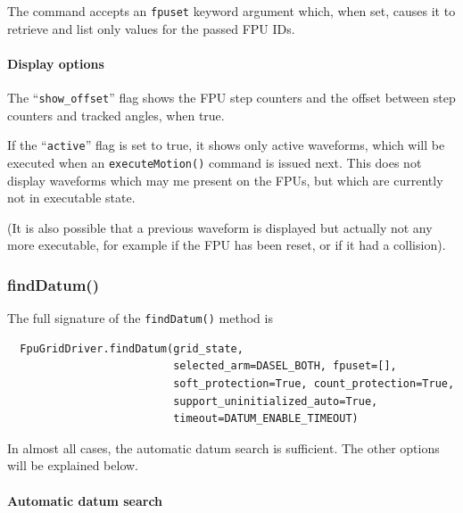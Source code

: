 \documentclass[11pt,a4paper]{scrartcl}
\begin{document}
The command accepts an \texttt{fpuset} keyword argument which, when
set, causes it to retrieve and list only values for the passed FPU
IDs.

\paragraph{Display options}

The ``\texttt{show\_offset}'' flag shows the FPU step counters and
the offset between step counters and tracked angles, when
true.

If the ``\texttt{active}'' flag is set to true, it shows only active
waveforms, which will be executed when an \texttt{executeMotion()}
command is issued next. This does not display waveforms which may me
present on the FPUs, but which are currently not in executable state.

(It is also possible that a previous waveform is displayed but
actually not any more executable, for example if the FPU has been
reset, or if it had a collision).

\subsubsection{findDatum()}
\label{sec:finddatum}

The full signature of the \texttt{findDatum()} method is

\begin{verbatim}
  FpuGridDriver.findDatum(grid_state,
                          selected_arm=DASEL_BOTH, fpuset=[],
                          soft_protection=True, count_protection=True, 
                          support_uninitialized_auto=True,
                          timeout=DATUM_ENABLE_TIMEOUT)
\end{verbatim}

In almost all cases, the automatic datum search is sufficient.  The
other options will be explained below.

\paragraph{Automatic datum search}
\end{document}
